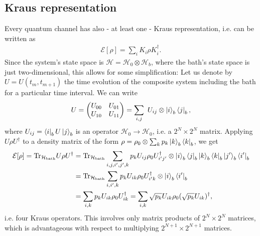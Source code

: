 \documentclass[12pt,a4paper]{article}
\newcommand{\Tr}{{\operatorname{Tr}}}
\begin{document}
\subsection{Kraus representation}
Every quantum channel has also - at least one - Kraus representation, i.e. can be written as
\begin{align}\label{eq:def_kraus_rep}
    \mathcal{E}[\rho] = \sum_i K_i \rho K_i^{\dagger}.
\end{align}
Since the system's state space is $\mathcal{H}=\mathcal{H}_0\otimes \mathcal{H}_b$, where the bath's state space is just two-dimensional, this allows for some simplification: Let us denote by $U=U(t_m,t_{m+1})$ the time evolution of the composite system including the bath for a particular time interval. We can write
\begin{align}\label{eq:unitaryblocks_kraus}
U =
\begin{pmatrix}
U_{00} & U_{01} \\
U_{10} & U_{11} 
\end{pmatrix}= \sum_{i,j}\ U_{ij} \otimes\ket{i}_{b} \bra{j}_{b},
\end{align}
where $U_{ij} = \bra{i}_{b} U  \ket{j}_{b}$ is an operator $\mathcal{H}_0 \to \mathcal{H}_0$, i.e. a $2^N \times 2^N$ matrix. Applying $U\rho U^{\dagger}$ to a density matrix of the form $\rho = \rho_0 \otimes \sum_{k} p_k  \ket{k}_{b}\bra{k}_{b}$, we get
\begin{align}\label{eq:kraus_for_bath}
  \mathcal{E}[\rho]=  \Tr_{\mathcal H_{\rm bath}} U\rho U^{\dagger} &= 
     \Tr_{\mathcal H_{\rm bath}}
     \sum_{i,j,i',j',k} p_k  U_{ij}\rho_0 U_{i'j'}^{\dagger} \otimes\ket{i}_{b} \bra{j}_{b} \ket{k}_{b}\bra{k}_{b}  \ket{j'}_{b} \bra{i'}_{b} \\
     &=\Tr_{\mathcal H_{\rm bath}}
     \sum_{i,i',k} p_k  U_{ik}\rho_0 U_{i'k}^{\dagger} \otimes\ket{i}_{b}  \bra{i'}_{b}\\
     &= \sum_{i,k} p_k  U_{ik}\rho_0 U_{ik}^{\dagger} = 
     \sum_{i,k} \sqrt{p_k}  U_{ik}\rho_0 (\sqrt{p_k}U_{ik})^{\dagger},
\end{align} i.e. four Kraus operators.
This involves only matrix products of $2^N \times 2^N$ matrices, which is advantageous with respect to multiplying $2^{N+1} \times 2^{N+1}$ matrices.
\end{document}
